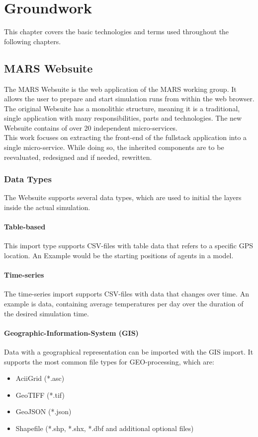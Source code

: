 
\chapter{Groundwork}
This chapter covers the basic technologies and terms used throughout the following chapters.



\section{MARS Websuite}
The MARS Websuite is the web application of the MARS working group. It allows the user to prepare and start simulation runs from within the web browser.\\
The original Websuite has a monolithic structure, meaning it is a traditional, single application with many responsibilities, parts and technologies. The new Websuite contains of over 20 independent micro-services.\\
This work focuses on extracting the front-end of the fullstack application into a single micro-service. While doing so, the inherited components are to be reevaluated, redesigned and if needed, rewritten.


\subsection{Data Types}
\label{sec:data-types}
The Websuite supports several data types, which are used to initial the layers inside the actual simulation.

\subsubsection{Table-based}
This import type supports CSV-files with table data that refers to a specific GPS location. An Example would be the starting positions of agents in a model.

\subsubsection{Time-series}
The time-series import supports CSV-files with data that changes over time. An example is data, containing average temperatures per day over the duration of the desired simulation time.

\subsubsection{Geographic-Information-System (GIS)}
Data with a geographical representation can be imported with the GIS import. It supports the most common file types for GEO-processing, which are:
\begin{itemize}
	\item AciiGrid (*.asc)
	\item GeoTIFF (*.tif)
	\item GeoJSON (*.json)
	\item Shapefile (*.shp, *.shx, *.dbf and additional optional files)
\end{itemize}

